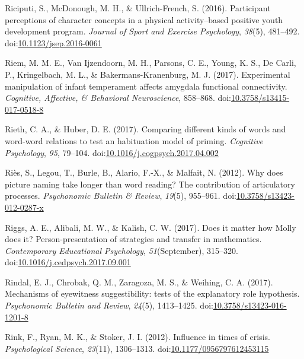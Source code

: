 \documentclass[english,man]{apa6}
\theoremstyle{definition}
\theoremstyle{definition}
\theoremstyle{definition}
\theoremstyle{remark}
\begin{document}
\hypertarget{ref-Riciputi2016}{}
Riciputi, S., McDonough, M. H., \& Ullrich-French, S. (2016).
Participant perceptions of character concepts in a physical
activity--based positive youth development program. \emph{Journal of
Sport and Exercise Psychology}, \emph{38}(5), 481--492.
doi:\href{https://doi.org/10.1123/jsep.2016-0061}{10.1123/jsep.2016-0061}

\hypertarget{ref-Riem2017}{}
Riem, M. M. E., Van Ijzendoorn, M. H., Parsons, C. E., Young, K. S., De
Carli, P., Kringelbach, M. L., \& Bakermans-Kranenburg, M. J. (2017).
Experimental manipulation of infant temperament affects amygdala
functional connectivity. \emph{Cognitive, Affective, \& Behavioral
Neuroscience}, 858--868.
doi:\href{https://doi.org/10.3758/s13415-017-0518-8}{10.3758/s13415-017-0518-8}

\hypertarget{ref-Rieth2017}{}
Rieth, C. A., \& Huber, D. E. (2017). Comparing different kinds of words
and word-word relations to test an habituation model of priming.
\emph{Cognitive Psychology}, \emph{95}, 79--104.
doi:\href{https://doi.org/10.1016/j.cogpsych.2017.04.002}{10.1016/j.cogpsych.2017.04.002}

\hypertarget{ref-Ries2012}{}
Riès, S., Legou, T., Burle, B., Alario, F.-X., \& Malfait, N. (2012).
Why does picture naming take longer than word reading? The contribution
of articulatory processes. \emph{Psychonomic Bulletin \& Review},
\emph{19}(5), 955--961.
doi:\href{https://doi.org/10.3758/s13423-012-0287-x}{10.3758/s13423-012-0287-x}

\hypertarget{ref-Riggs2017}{}
Riggs, A. E., Alibali, M. W., \& Kalish, C. W. (2017). Does it matter
how Molly does it? Person-presentation of strategies and transfer in
mathematics. \emph{Contemporary Educational Psychology},
\emph{51}(September), 315--320.
doi:\href{https://doi.org/10.1016/j.cedpsych.2017.09.001}{10.1016/j.cedpsych.2017.09.001}

\hypertarget{ref-Rindal2017}{}
Rindal, E. J., Chrobak, Q. M., Zaragoza, M. S., \& Weihing, C. A.
(2017). Mechanisms of eyewitness suggestibility: tests of the
explanatory role hypothesis. \emph{Psychonomic Bulletin and Review},
\emph{24}(5), 1413--1425.
doi:\href{https://doi.org/10.3758/s13423-016-1201-8}{10.3758/s13423-016-1201-8}

\hypertarget{ref-Rink2012}{}
Rink, F., Ryan, M. K., \& Stoker, J. I. (2012). Influence in times of
crisis. \emph{Psychological Science}, \emph{23}(11), 1306--1313.
doi:\href{https://doi.org/10.1177/0956797612453115}{10.1177/0956797612453115}
\end{document}

